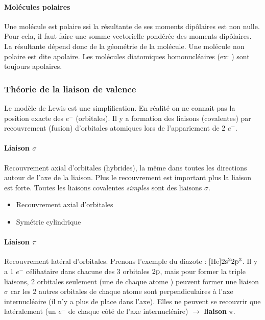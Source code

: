 \paragraph{Molécules polaires}
Une molécule est polaire ssi la résultante de ses moments dipôlaires est non nulle.
Pour cela, il faut faire une somme vectorielle pondérée des moments dipôlaires.
La résultante dépend donc de la géométrie de la molécule.
Une molécule non polaire est dite apolaire.
Les molécules diatomiques homonucléaires (ex: ) sont toujours apolaires.

\subsubsection{Théorie de la liaison de valence}
Le modèle de Lewis est une simplification.
En réalité on ne connait pas la position exacte des $e^-$ (orbitales).
Il y a formation des liaisons (covalentes) par recouvrement (fusion) d'orbitales atomiques lors de l'appariement de 2 $e^-$.

\paragraph{Liaison $\sigma$}

Recouvrement axial d'orbitales (hybrides),
la même dans toutes les directions autour de l'axe de la liaison.
Plus le recouvrement est important plus la liaison est forte.
Toutes les liaisons covalentes {\it simples} sont des liaisons $\sigma$.

\begin{itemize}
  \item Recouvrement axial d'orbitales
  \item Symétrie cylindrique
\end{itemize}

\paragraph{Liaison $\pi$}

Recouvrement latéral d'orbitales.
Prenons l'exemple du diazote : [He]$2\mathrm{s}^2 2\mathrm{p}^3$.
Il y a 1 $e^-$ célibataire dans chacune des 3 orbitales $2\mathrm{p}$,
mais pour former la triple liaisons,
2 orbitales seulement (une de chaque atome ) peuvent former une liaison $\sigma$ car les 2 autres orbitales de chaque atome sont perpendiculaires à l'axe internucléaire (il n'y a plus de place dans l'axe).
Elles ne peuvent se recouvrir que latéralement (un $e^-$ de chaque côté de l'axe internucléaire) $\rightarrow$ \textbf{liaison} $\pi$.

